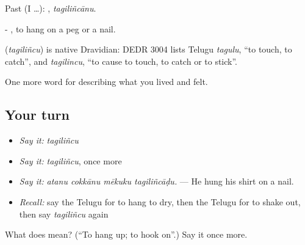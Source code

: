 Past (I …): , \emph{tagiliñcānu}.

- , to hang on a peg or a nail.

\begin{cousinweb}
\textbf{} (\emph{tagiliñcu}) is native Dravidian: DEDR 3004 lists Telugu \emph{tagulu}, \textquotedblleft{}to touch, to catch\textquotedblright{}, and \emph{tagilincu}, \textquotedblleft{}to cause to touch, to catch or to stick\textquotedblright{}.
\end{cousinweb}

\begin{grammarlens}[title={What you've built}]
One more word for describing what you lived and felt.
\end{grammarlens}

\subsection*{Your turn}
\begin{itemize}
\raggedright
  \item \emph{Say it:} \emph{tagiliñcu}
  \item \emph{Say it:} \emph{tagiliñcu}, once more
  \item \emph{Say it:} \emph{atanu cokkānu mēkuku tagiliñcāḍu.} — He hung his shirt on a nail.
  \item \emph{Recall:} say the Telugu for to hang to dry, then the Telugu for to shake out, then say \emph{tagiliñcu} again
\end{itemize}

\begin{tcolorbox}[breakable,colback=teal!4,colframe=teal!35!black,title={Before you move on}]
What does  mean? (\textquotedblleft{}To hang up; to hook on\textquotedblright{}.) Say it once more.
\end{tcolorbox}
